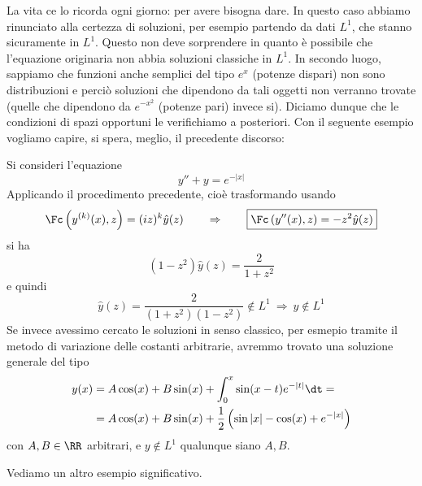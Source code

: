 La vita ce lo ricorda ogni giorno: per avere bisogna dare. In questo caso abbiamo rinunciato alla certezza di soluzioni, per esempio partendo da dati $L^1$, che stanno sicuramente in $L^1$. Questo non deve sorprendere in quanto è possibile che l'equazione originaria non abbia soluzioni classiche in $L^1$. In secondo luogo, sappiamo che funzioni anche semplici del tipo $e^x$ (potenze dispari) non sono distribuzioni e perciò soluzioni che dipendono da tali oggetti non verranno trovate (quelle che dipendono da $e^{-x^2}$ (potenze pari) invece si). Diciamo dunque che le condizioni di spazi opportuni le verifichiamo a posteriori. Con il seguente esempio vogliamo capire, si spera, meglio, il precedente discorso:
\begin{exa}
Si consideri l'equazione
\begin{equation*}
y''+y=e^{-|x|}
\end{equation*}
Applicando il procedimento precedente, cioè trasformando usando
\begin{equation*}
\Fc\left(y^{(k)}(x),z\right)=(iz)^k\hat{y}(z)\qquad\Rightarrow\qquad\boxed{\Fc\left(y''(x),z\right)=-z^2\hat{y}(z)}
\end{equation*}
si ha
\begin{equation*}
(1-z^2)\hat{y}(z)=\frac{2}{1+z^2}
\end{equation*}
e quindi
\begin{equation*}
\hat{y}(z)=\frac{2}{(1+z^2)(1-z^2)}\notin L^1\ \Rightarrow\ y\notin L^1
\end{equation*}
Se invece avessimo cercato le soluzioni in senso classico, per esmepio tramite il metodo di variazione delle costanti arbitrarie, avremmo trovato una soluzione generale del tipo
\begin{align*}
y(x)&=A\cos(x)+B\sin(x)+\int_0^x\sin(x-t)e^{-|t|}\dt =\\
&=A\cos(x)+B\sin(x)+\frac{1}{2}\left(\sin|x|-\cos(x)+e^{-|x|}\right)
\end{align*}
con $A,B\in\RR$ arbitrari, e $y\notin L^1$ qualunque siano $A,B$.
\end{exa}

Vediamo un altro esempio significativo.


